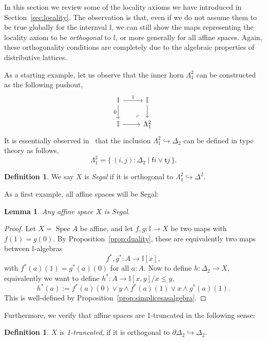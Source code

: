 \documentclass[12pt]{amsart}
\newtheorem{lemma}[theorem]{Lemma}
\theoremstyle{definition}
\newtheorem{definition}[theorem]{Definition}
\newcommand{\mbb}[1]{\mathbb{#1}}
\newcommand{\I}{\mbb I}
\newcommand{\ms}[1]{\mathsf{#1}}
\newcommand{\scomp}[2]{\{\,#1\mid#2\,\}}
\newcommand{\hook}{\hookrightarrow}
\newcommand{\spec}{\operatorname{Spec}}
\begin{document}
In this section we review some of the locality axioms we have introduced in Section~\ref{sec:locality}. The observation is that, even if we do not assume them to be true globally for the internval $\I$, we can still show the maps representing the locality axiom to be \emph{orthogonal} to $\I$, or more generally for all affine spaces. Again, these orthogonality conditions are completely due to the algebraic properties of distributive lattices. 

As a starting example, let us observe that the inner horn $\Lambda^2_1$ can be constructed as the following pushout,
\[
  \begin{tikzcd}
    1 \ar[d, "0"'] \ar[r, "1"] & \I \ar[d] \\
    \I \ar[r] & \Lambda^2_1
    \arrow["\lrcorner"{anchor=center, pos=0.125, rotate=180}, draw=none, from=2-2, to=1-1]
  \end{tikzcd}
\]
It is essentially observed in~\cite{riehl2017type} that the inclusion $\Lambda^2_1 \hook \Delta_2$ can be defined in type theory as follows,
\[ \Lambda^2_1 = \scomp{(i,j) : \Delta_2}{\ms fi \vee \ms tj}. \]

\begin{definition}
  We say $X$ is \emph{Segal} if it is orthogonal to $\Lambda^2_1 \hook \Delta^2$.
\end{definition}

As a first example, all affine spaces will be Segal:

\begin{lemma}
  Any affine space $X$ is Segal.
\end{lemma}
\begin{proof}
  Let $X = \spec A$ be affine, and let $f,g : \I \to X$ be two maps with $f(1) = g(0)$. By Proposition~\ref{prop:duality}, these are equivalently two maps between $\I$-algebras
  \[ f^*,g^* : A \to \I[x], \]
  with $f^*(a)(1) = g^*(a)(0)$ for all $a:A$. Now to define $h : \Delta_2 \to X$, equivalently we want to define $h^* : A \to \I[x,y]/x \le y$,
  \[ h^*(a) := f^*(a)(0) \vee y \wedge f^*(a)(1) \vee x \wedge g^*(a)(1). \]
  This is well-defined by Proposition~\ref{prop:simplicesasalgebra}.
\end{proof}

Furthermore, we verify that affine spaces are 1-truncated in the following sense:

\begin{definition}
  $X$ is \emph{1-truncated}, if it is orthogonal to $\partial\Delta_2 \hook \Delta_2$.
\end{definition}
\end{document}
